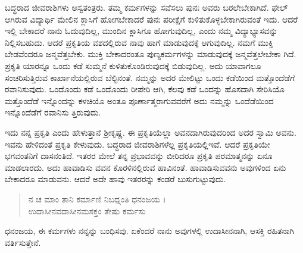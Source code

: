 ಬದ್ಧರಾದ ಜೀವರಾಶಿಗಳು ಅಸ್ವತಂತ್ರರು. ತಮ್ಮ ಕರ್ಮಗಳನ್ನು ಸವೆಸಲು ಪುನಃ ಅವರು ಬರಲೇಬೇಕಾಗಿದೆ. ಫೇಲ್ ಆಗಿರುವ ವಿದ್ಯಾರ್ಥಿ ಮೇಲಿನ ಕ್ಲಾಸಿಗೆ ಹೋಗಬೇಕಾದರೆ ಪುನಃ ಪರೀಕ್ಷೆಗೆ ಕುಳಿತುಕೊಳ್ಳಬೇಕಾಗಿರುವಂತೆ ಇದು. ಆದರೆ ಇಲ್ಲಿ ಬೇಕಾದರೆ ನಾನು ಓದುವುದಿಲ್ಲ, ಮುಂದಿನ ಕ್ಲಾಸಿಗೂ ಹೋಗುವುದಿಲ್ಲ, ಎಂದು ನಮ್ಮ ವಿದ್ಯಾಭ್ಯಾಸವನ್ನು ನಿಲ್ಲಿಸಬಹುದು. ಆದರೆ ಪ್ರಕೃತಿಯ ವಶದಲ್ಲಿರುವ ನಾವು ಹಾಗೆ ಮಾಡುವುದಕ್ಕೆ ಆಗುವುದಿಲ್ಲ. ನಮಗೆ ಮುಕ್ತಿ ಬೇಡವೆಂದರೂ ಜನ್ಮವೆತ್ತಬೇಕು. ಮುಕ್ತಿ ಬೇಕಾದರಂತೂ ಪುಣ್ಯಕರ್ಮಗಳನ್ನು ಮಾಡುವುದಕ್ಕೆ ಜನ್ಮವೆತ್ತಲೇಬೇಕಾ ಗಿದೆ. ಪ್ರಕೃತಿ ಯಾರನ್ನೂ ಒಂದು ಕಡೆ ಸುಮ್ಮನೆ ಕುಳಿತುಕೊಂಡಿರುವುದಕ್ಕೆ ಬಿಡುವುದಿಲ್ಲ. ಅದು ಯಾವಾಗಲೂ ಸಂಚರಿಸುತ್ತಿರುವ ಕಾರ್ಖಾನೆಯಲ್ಲಿರುವ ಬೆಲ್ಟಿನಂತೆ. ನಮ್ಮನ್ನು ಅದರ ಮೇಲಿಟ್ಟು ಒಂದು ಕಡೆಯಿಂದ ಮತ್ತೊಂದೆಡೆಗೆ ರವಾನಿಸುವುದು. ಒಂದೊಂದು ಕಡೆ ಒಂದೊಂದು ರೀಪೇರಿ ಆಗಿ, ಕೆಲವು ಕಡೆ ಒಂದನ್ನು ಹೊಸದಾಗಿ ಸೇರಿಸಿಯೊ ಮತ್ತೊಂದೆಡೆ ಇನ್ನೊಂದನ್ನು ಕಳಚಿಯೊ ಅಂತೂ ಪೂರ್ಣಾತ್ಮರಾಗುವವರೆಗೆ ಅದು ನಮ್ಮನ್ನು ಒಂದೆಡೆಯಿಂದ ಇನ್ನೊಂದೆಡೆಗೆ ರವಾನಿಸು ತ್ತಿರುವುದು.

ಇದು ನನ್ನ ಪ್ರಕೃತಿ ಎಂದು ಹೇಳುತ್ತಾನೆ ಶ್ರೀಕೃಷ್ಣ. ಈ ಪ್ರಕೃತಿಯೆಲ್ಲಾ ಅವನದಾಗಿರುವುದರಿಂದ ಅದರ ಸ್ವಾಮಿ ಅವನು. ಇವನು ಹೇಳಿದಂತೆ ಪ್ರಕೃತಿ ಕೇಳುವುದು. ಬದ್ಧರಾದ ಜೀವರಾಶಿಗಳೆಲ್ಲ ಪ್ರಕೃತಿಯಲ್ಲಿಇವೆ. ಆದರೆ ಪ್ರಕೃತಿಯೇ ಭಗವಂತನಿಗೆ ದಾಸನಂತಿದೆ. ಇತರರ ಮೇಲೆ ತನ್ನ ಪ್ರಭಾವವನ್ನು ಬೀರಿದರೂ ಪ್ರಕೃತಿ ಪರಮಾತ್ಮನನ್ನು ಏನೂ ಮಾಡಲಾರದು. ಅದು ಹಾವಾಡಿಸು ವವನ ಕೊರಳಿನಲ್ಲಿರುವ ಹಾವಿನಂತೆ. ಹಾವಾಡಿಸುವವನು ಅವುಗಳಿಂದ ಏನು ಬೇಕಾದರೂ ಮಾಡುವನು. ಆದರೆ ಅದೇ ಹಾವು ಇತರರನ್ನು ಕಂಡರೆ ಬುಸುಗುಟ್ಟುವುದು.

\begin{verse}
ನ ಚ ಮಾಂ ತಾನಿ ಕರ್ಮಾಣಿ ನಿಬಧ್ನಂತಿ ಧನಂಜಯ ।\\ಉದಾಸೀನವದಾಸೀನಮಸಕ್ತಂ ತೇಷು ಕರ್ಮಸು 
\end{verse}

{\small ಧನಂಜಯ, ಈ ಕರ್ಮಗಳು ನನ್ನನ್ನು ಬಂಧಿಸವು. ಏಕೆಂದರೆ ನಾನು ಅವುಗಳಲ್ಲಿ ಉದಾಸೀನನಾಗಿ, ಆಸಕ್ತಿ ರಹಿತನಾಗಿ ವರ್ತಿಸುತ್ತೇನೆ.}

